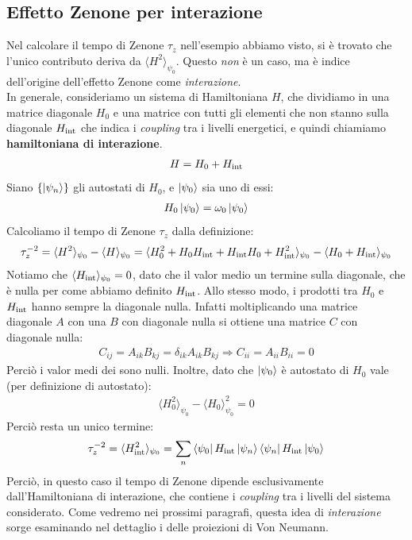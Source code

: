 \documentclass[../../InformazioneQuantistica.tex]{subfiles}
\begin{document}
\subsection{Effetto Zenone per interazione}
Nel calcolare il tempo di Zenone $\tau_z$ nell'esempio abbiamo visto, si è trovato che l'unico contributo deriva da $\langle H^2 \rangle_{\psi_0}$. Questo \textit{non} è un caso, ma è indice dell'origine dell'effetto Zenone come \textit{interazione}.\\
In generale, consideriamo un sistema di Hamiltoniana $H$, che dividiamo in una matrice diagonale $H_0$ e una matrice con tutti gli elementi che non stanno sulla diagonale $H_{\operatorname{int}}$ che indica i \textit{coupling} tra i livelli energetici, e quindi chiamiamo \textbf{hamiltoniana di interazione}.
\begin{align*}
H=H_0+ H_{\operatorname{int}}
\end{align*}
Siano $\{\Ket{\psi_n}\}$ gli autostati di $H_0$, e $\Ket{\psi_0}$ sia uno di essi:
\begin{align*}
H_0 \Ket{\psi_0} = \omega_0 \Ket{\psi_0}
\end{align*}
Calcoliamo il tempo di Zenone $\tau_z$ dalla definizione:
\begin{align*}
\tau_z^{-2} = \langle H^2 \rangle_{\psi_0}-\langle H \rangle_{\psi_0} = \langle H_0^2 + H_0 H_{\operatorname{int}} + H_{\operatorname{int}}H_0 + H_{\operatorname{int}}^2 \rangle_{\psi_0}-\langle H_0 + H_{\operatorname{int}}\rangle_{\psi_0}
\end{align*}
Notiamo che $\langle H_{\operatorname{int}}\rangle_{\psi_0} = 0$, dato che il valor medio  un termine sulla diagonale, che è nulla per come abbiamo definito $H_{\operatorname{int}}$. Allo stesso modo, i prodotti tra $H_0$ e $H_{\operatorname{int}}$ hanno sempre la diagonale nulla. Infatti moltiplicando una matrice diagonale $A$ con una $B$ con diagonale nulla si ottiene una matrice $C$ con diagonale nulla:
\begin{align*}
C_{ij} = A_{ik}B_{kj}=\delta_{ik}A_{ik}B_{kj}\Rightarrow C_{ii}=A_{ii}B_{ii}=0
\end{align*}
Perciò i valor medi dei  sono nulli. Inoltre, dato che $\Ket{\psi_0}$ è autostato di $H_0$ vale (per definizione di autostato):
\begin{align*}
\langle H_0^2 \rangle_{\psi_0} - \langle H_0 \rangle^2_{\psi_0} =0
\end{align*}  
Perciò resta un unico termine:
\begin{align*}
\tau_z^{-2} = \langle H_{\operatorname{int}}^2 \rangle_{\psi_0} = \sum_n \Bra{\psi_0}H_{\operatorname{int}}\Ket{\psi_n}\Bra{\psi_n}H_{\operatorname{int}}\Ket{\psi_0}
\end{align*}
Perciò, in questo caso il tempo di Zenone dipende esclusivamente dall'Hamiltoniana di interazione, che contiene i \textit{coupling} tra i livelli del sistema considerato. Come vedremo nei prossimi paragrafi, questa idea di \textit{interazione} sorge esaminando nel dettaglio i  delle proiezioni di Von Neumann.
\end{document}
